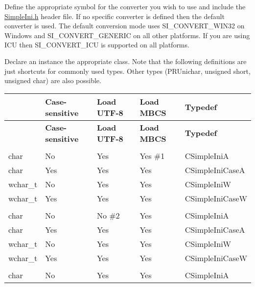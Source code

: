 \begin{DoxyEnumerate}
\item Define the appropriate symbol for the converter you wish to use and include the \hyperlink{_simple_ini_8h_source}{Simple\+Ini.\+h} header file. If no specific converter is defined then the default converter is used. The default conversion mode uses S\+I\+\_\+\+C\+O\+N\+V\+E\+R\+T\+\_\+\+W\+I\+N32 on Windows and S\+I\+\_\+\+C\+O\+N\+V\+E\+R\+T\+\_\+\+G\+E\+N\+E\+R\+IC on all other platforms. If you are using I\+CU then S\+I\+\_\+\+C\+O\+N\+V\+E\+R\+T\+\_\+\+I\+CU is supported on all platforms.
\item Declare an instance the appropriate class. Note that the following definitions are just shortcuts for commonly used types. Other types (P\+R\+Unichar, unsigned short, unsigned char) are also possible. \tabulinesep=1mm
\begin{longtabu} spread 0pt [c]{*5{|X[-1]}|}
\hline
{}&{\bf Case-\/sensitive }&{\bf Load U\+T\+F-\/8 }&{\bf Load M\+B\+CS }&{\bf Typedef }\\
\endfirsthead
\hline
\endfoot
\hline
{}&{\bf Case-\/sensitive }&{\bf Load U\+T\+F-\/8 }&{\bf Load M\+B\+CS }&{\bf Typedef }\\
\endhead
{}\\
char &No &Yes &Yes \#1 &C\+Simple\+IniA \\
char &Yes &Yes &Yes &C\+Simple\+Ini\+CaseA \\
wchar\+\_\+t &No &Yes &Yes &C\+Simple\+IniW \\
wchar\+\_\+t &Yes &Yes &Yes &C\+Simple\+Ini\+CaseW \\
\\
char &No &No \#2 &Yes &C\+Simple\+IniA \\
char &Yes &Yes &Yes &C\+Simple\+Ini\+CaseA \\
wchar\+\_\+t &No &Yes &Yes &C\+Simple\+IniW \\
wchar\+\_\+t &Yes &Yes &Yes &C\+Simple\+Ini\+CaseW \\
\\
char &No &Yes &Yes &C\+Simple\+IniA \\

\end{longtabu}
\end{DoxyEnumerate}
